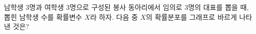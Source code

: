 남학생 3명과 여학생 3명으로 구성된 봉사 동아리에서 임의로 3명의 대표를 뽑을 때, 뽑힌 남학생 수를 확률변수 $X$라 하자. 다음 중 $X$의 확률분포를 그래프로 바르게 나타낸 것은?
\begin{choicesii}{}{}{}{}{}\end{choicesii}
